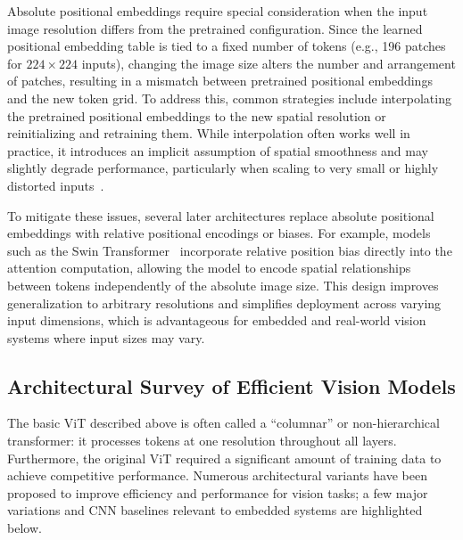 \documentclass[runningheads,a4paper]{llncs}
\begin{document}
Absolute positional embeddings require special consideration when the input image resolution differs from the pretrained configuration. Since the learned positional embedding table is tied to a fixed number of tokens (e.g., 196 patches for $224\times224$ inputs), changing the image size alters the number and arrangement of patches, resulting in a mismatch between pretrained positional embeddings and the new token grid. To address this, common strategies include interpolating the pretrained positional embeddings to the new spatial resolution or reinitializing and retraining them. While interpolation often works well in practice, it introduces an implicit assumption of spatial smoothness and may slightly degrade performance, particularly when scaling to very small or highly distorted inputs~\cite{ranftl2021dpt,bolya2024window_attention}.

To mitigate these issues, several later architectures replace absolute positional embeddings with relative positional encodings or biases. For example, models such as the Swin Transformer~\cite{liu2021swin} incorporate relative position bias directly into the attention computation, allowing the model to encode spatial relationships between tokens independently of the absolute image size. This design improves generalization to arbitrary resolutions and simplifies deployment across varying input dimensions, which is advantageous for embedded and real-world vision systems where input sizes may vary.

\subsection{Architectural Survey of Efficient Vision Models}\label{sec:arch-survey}
The basic ViT described above is often called a “columnar” or non-hierarchical transformer: it processes tokens at one resolution throughout all layers. Furthermore, the original ViT required a significant amount of training data to achieve competitive performance. Numerous architectural variants have been proposed to improve efficiency and performance for vision tasks; a few major variations and CNN baselines relevant to embedded systems are highlighted below.
\end{document}
